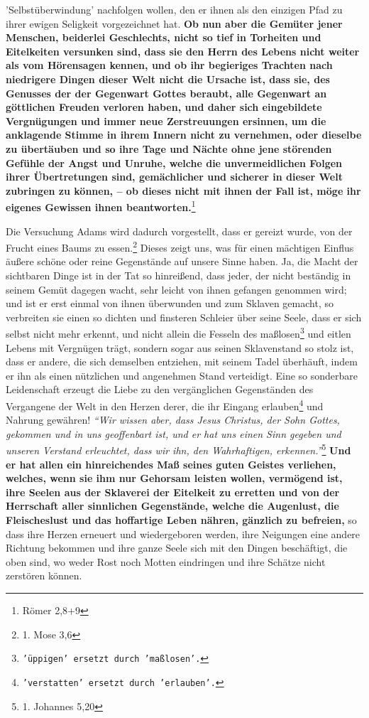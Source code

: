 {{{'Selbstüberwindung'}}
nachfolgen wollen, den er ihnen
als den einzigen Pfad zu ihrer ewigen Seligkeit vorgezeichnet hat. \textbf{Ob
nun aber
die Gemüter jener Menschen, beiderlei Geschlechts, nicht so tief in Torheiten
und
Eitelkeiten versunken sind, dass sie den Herrn des Lebens nicht weiter als vom
Hörensagen kennen, und ob ihr begieriges Trachten nach niedrigere Dingen dieser
Welt nicht die Ursache ist, dass sie, des Genusses der der Gegenwart Gottes
beraubt,
alle Gegenwart an göttlichen Freuden verloren haben, und daher sich
eingebildete Vergnügungen und immer neue Zerstreuungen ersinnen, um die
anklagende Stimme in ihrem Innern nicht zu vernehmen, oder dieselbe zu
übertäuben und so ihre Tage und Nächte ohne jene störenden Gefühle der Angst
und Unruhe, welche die unvermeidlichen Folgen ihrer Übertretungen sind,
gemächlicher und sicherer in dieser Welt zubringen zu können, -- ob dieses nicht
mit ihnen der Fall ist, möge ihr eigenes Gewissen ihnen
beantworten.}\footnote{Römer 2,8+9}

\medskip

Die Versuchung Adams wird dadurch vorgestellt, dass er gereizt wurde, von der
Frucht eines Baums zu essen.\footnote{1. Mose 3,6}
Dieses zeigt uns, was für
einen mächtigen Einflus äußere schöne oder reine Gegenstände auf unsere Sinne
haben. Ja, die Macht der sichtbaren Dinge ist in der Tat so hinreißend, dass
jeder, der nicht beständig in seinem Gemüt dagegen wacht, sehr leicht von
ihnen gefangen genommen wird; und ist er erst einmal von ihnen überwunden und
zum Sklaven gemacht, so verbreiten sie einen so dichten
und finsteren Schleier
über seine Seele, dass er sich selbst nicht mehr erkennt, und nicht allein die
Fesseln des maßlosen\footnote{\texttt{'üppigen' ersetzt durch 'maßlosen'.}} und
eitlen Lebens mit
Vergnügen trägt, sondern sogar aus
seinen Sklavenstand so stolz ist, dass er andere, die sich
demselben entziehen,
mit seinem Tadel überhäuft, indem er ihn als einen nützlichen und angenehmen
Stand verteidigt. Eine so sonderbare Leidenschaft erzeugt die Liebe zu den
vergänglichen Gegenständen des Vergangene der Welt in den Herzen derer, die ihr
Eingang erlauben\footnote{\texttt{'verstatten' ersetzt durch 'erlauben'.}} und
Nahrung gewähren!
\textit{"`Wir wissen aber, dass Jesus Christus,
der Sohn Gottes, gekommen und in uns geoffenbart ist, und er hat uns einen Sinn
gegeben und unseren Verstand erleuchtet, dass wir ihn, den Wahrhaftigen,
erkennen."'}\footnote{1. Johannes 5,20}
\textbf{Und er hat allen ein hinreichendes Maß seines
guten Geistes verliehen, welches, wenn sie ihm nur Gehorsam leisten wollen,
vermögend ist, ihre Seelen aus der Sklaverei der Eitelkeit zu erretten und von
der Herrschaft aller sinnlichen Gegenstände, welche die Augenlust, die
Fleischeslust und das hoffartige Leben nähren, gänzlich zu befreien,} so dass
ihre
Herzen erneuert und wiedergeboren werden, ihre Neigungen
eine andere Richtung
bekommen und ihre ganze Seele sich mit den Dingen beschäftigt, die oben sind,
wo weder Rost noch Motten eindringen und ihre Schätze nicht zerstören können.

}
